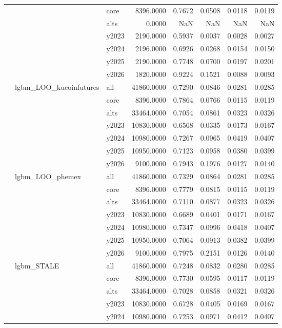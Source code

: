 \begin{tabular}{lllrrrrr}
 &  & core & 8396.0000 & 0.7672 & 0.0508 & 0.0118 & 0.0119 \\
 &  & alts & 0.0000 & NaN & NaN & NaN & NaN \\
 &  & y2023 & 2190.0000 & 0.5937 & 0.0037 & 0.0028 & 0.0027 \\
 &  & y2024 & 2196.0000 & 0.6926 & 0.0268 & 0.0154 & 0.0150 \\
 &  & y2025 & 2190.0000 & 0.7748 & 0.0700 & 0.0197 & 0.0201 \\
 &  & y2026 & 1820.0000 & 0.9224 & 0.1521 & 0.0088 & 0.0093 \\
\cline{2-8}
 & \multirow[t]{7}{*}{lgbm_LOO_kucoinfutures} & all & 41860.0000 & 0.7290 & 0.0846 & 0.0281 & 0.0285 \\
 &  & core & 8396.0000 & 0.7864 & 0.0766 & 0.0115 & 0.0119 \\
 &  & alts & 33464.0000 & 0.7054 & 0.0861 & 0.0323 & 0.0326 \\
 &  & y2023 & 10830.0000 & 0.6568 & 0.0335 & 0.0173 & 0.0167 \\
 &  & y2024 & 10980.0000 & 0.7267 & 0.0965 & 0.0419 & 0.0407 \\
 &  & y2025 & 10950.0000 & 0.7123 & 0.0958 & 0.0380 & 0.0399 \\
 &  & y2026 & 9100.0000 & 0.7943 & 0.1976 & 0.0127 & 0.0140 \\
\cline{2-8}
 & \multirow[t]{7}{*}{lgbm_LOO_phemex} & all & 41860.0000 & 0.7329 & 0.0864 & 0.0281 & 0.0285 \\
 &  & core & 8396.0000 & 0.7779 & 0.0815 & 0.0115 & 0.0119 \\
 &  & alts & 33464.0000 & 0.7110 & 0.0877 & 0.0323 & 0.0326 \\
 &  & y2023 & 10830.0000 & 0.6689 & 0.0401 & 0.0171 & 0.0167 \\
 &  & y2024 & 10980.0000 & 0.7347 & 0.0996 & 0.0418 & 0.0407 \\
 &  & y2025 & 10950.0000 & 0.7064 & 0.0913 & 0.0382 & 0.0399 \\
 &  & y2026 & 9100.0000 & 0.7975 & 0.2151 & 0.0126 & 0.0140 \\
\cline{2-8}
 & \multirow[t]{7}{*}{lgbm_STALE} & all & 41860.0000 & 0.7248 & 0.0832 & 0.0280 & 0.0285 \\
 &  & core & 8396.0000 & 0.7730 & 0.0595 & 0.0117 & 0.0119 \\
 &  & alts & 33464.0000 & 0.7028 & 0.0858 & 0.0321 & 0.0326 \\
 &  & y2023 & 10830.0000 & 0.6728 & 0.0405 & 0.0169 & 0.0167 \\
 &  & y2024 & 10980.0000 & 0.7253 & 0.0971 & 0.0412 & 0.0407 \\

\end{tabular}
